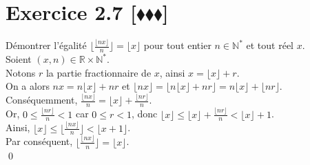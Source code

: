 \documentclass[10pt]{article}
\begin{document}

\section*{Exercice 2.7 [$\blacklozenge\blacklozenge\blacklozenge$]}
\begin{tcolorbox}[enhanced, width=7in, center, size=fbox, fontupper=\large, drop shadow southwest]
    Démontrer l'égalité $\lfloor\frac{\lfloor{nx}\rfloor}{n}\rfloor=\lfloor{x}\rfloor$ pour tout entier $n\in\mathbb{N}^*$ et tout réel $x$.\\[0.2cm]
    Soient $(x,n)\in\mathbb{R}\times\mathbb{N}^*$.\\[0.2cm]
    Notons $r$ la partie fractionnaire de $x$, ainsi $x=\lfloor{x}\rfloor+r$.\\[0.2cm]
    On a alors $nx=n\lfloor{x}\rfloor+nr$ et $\lfloor{nx}\rfloor=\lfloor{n\lfloor{x}\rfloor+nr}\rfloor=n\lfloor{x}\rfloor+\lfloor{nr}\rfloor$.\\[0.2cm]
    Conséquemment, $\frac{\lfloor{nx}\rfloor}{n}=\lfloor{x}\rfloor+\frac{\lfloor{nr}\rfloor}{n}$.\\[0.2cm]
    Or, $0\leq\frac{\lfloor{nr}\rfloor}{n}<1$ car $0\leq r<1$, donc $\lfloor{x}\rfloor\leq\lfloor{x}\rfloor+\frac{\lfloor{nr}\rfloor}{n}<\lfloor{x}\rfloor+1$.\\[0.2cm]
    Ainsi, $\lfloor{x}\rfloor\leq\lfloor\frac{\lfloor{nx}\rfloor}{n}\rfloor<\lfloor{x}+1\rfloor$.\\[0.2cm]
    Par conséquent, $\lfloor\frac{\lfloor{nx}\rfloor}{n}\rfloor = \lfloor{x}\rfloor$.\\
    \qed
\end{tcolorbox}
\end{document}
